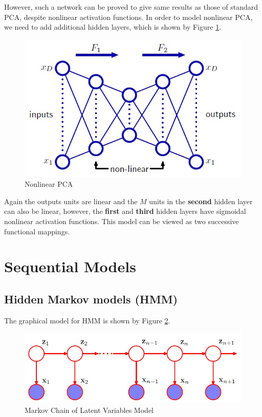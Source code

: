 \documentclass[a4paper]{book}
\begin{document}
However, such a network can be proved to give same results as those of standard PCA, despite nonlinear activation functions. In order to model nonlinear PCA, we need to add additional hidden layers, which is shown by Figure \ref{ANN2}.
\begin{figure}
	\centering
	\includegraphics[scale = .4]{ANN2}
	\caption{Nonlinear PCA} \label{ANN2}
\end{figure}
Again the outputs units are linear and the $M$ units in the \textbf{second} hidden layer can also be linear, however, the \textbf{first} and \textbf{third} hidden layers have sigmoidal nonlinear activation functions. This model can be viewed as two successive functional mappings.
\section{Sequential Models}
\subsection{Hidden Markov models (HMM)}
The graphical model for HMM is shown by Figure \ref{HMM}.
\begin{figure}
	\centering
	\includegraphics[scale=.5]{HMM}
	\caption{Markov Chain of Latent Variables Model}\label{HMM}
\end{figure}
\end{document}
